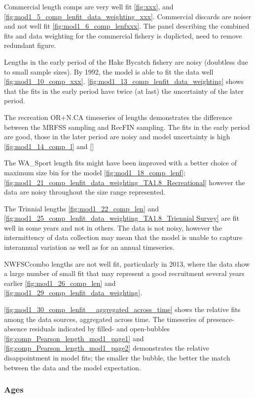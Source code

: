 \documentclass[12pt,]{article}
\begin{document}
Commercial length comps are very well fit \ref{fig:xxx}, and
\ref{fig:mod1_5_comp_lenfit_data_weighting_xxx}. Commercial discards are
noiser and not well fit \ref{fig:mod1_6_comp_lenfxxx}. The panel
describing the combined fits and data weighting for the commercial
fishery is duplicted, need to remove redundant figure.

Lengths in the early period of the Hake Bycatch fishery are noisy
(doubtless due to small sample sizes). By 1992, the model is able to fit
the data well \ref{fig:mod1_10_comp_xxx}.
\ref{fig:mod1_13_comp_lenfit_data_weighting} shows that the fits in the
early period have twice (at last) the uncertainty of the later period.

The recreation OR+N.CA timeseries of lengths demonstrates the difference
between the MRFSS sampling and RecFIN sampling. The fits in the early
period are good, those in the later period are noisy and model
uncertainty is high \ref{fig:mod1_14_comp_l} and \ref{}

The WA\_Sport length fits might have been improved with a better choice
of maximum size bin for the model \ref{fig:mod1_18_comp_lenf};
\ref{fig:mod1_21_comp_lenfit_data_weighting_TA1.8_Recreational} however
the data are noisy throughout the size range represented.

The Trinnial lengths \ref{fig:mod1_22_comp_len} and
\ref{fig:mod1_25_comp_lenfit_data_weighting_TA1.8_Triennial Survey} are
fit well in some years and not in others. The data is not noisy, however
the intermittency of data collection may mean that the model is unable
to capture interannual variation as well as for an annual timeseries.

NWFSCcombo lengths are not well fit, particularly in 2013, where the
data show a large number of small fit that may represent a good
recruitment several years earlier \ref{fig:mod1_26_comp_len} and
\ref{fig:mod1_29_comp_lenfit_data_weighting}.

\ref{fig:mod1_30_comp_lenfit__aggregated_across_time} shows the relative
fits among the data sources, aggregated across time. The timeseries of
presence-absence residuals indicated by filled- and open-bubbles
\ref{fig:comp_Pearson_length_mod1_page1} and
\ref{fig:comp_Pearson_length_mod1_page2} demonstrates the relative
disappointment in model fits; the smaller the bubble, the better the
match between the data and the model expectation.

\subsubsection{Ages}\label{ages}
\end{document}
